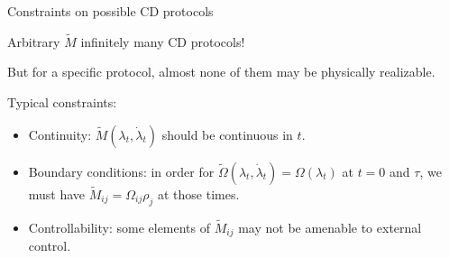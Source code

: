 \documentclass{beamer}
\begin{document}
\begin{frame}{Constraints on possible CD protocols}

  Arbitrary $\tilde{M}$ \quad \Rightarrow \quad infinitely many CD protocols!

  \vspace{1em}
  \pause

  But for a specific protocol, almost none of them may be {\color{blue} physically realizable}.

  \pause

  \vspace{1em} {\color{red} Typical constraints:}

  \begin{itemize}
  \item Continuity: $\tilde{M}(\lambda_t,\dot\lambda_t)$ should be
    continuous in $t$.
    \vspace{0.25em}
    \pause

  \item Boundary conditions:  in order for $\tilde{\Omega}(\lambda_t,\dot\lambda_t) = \Omega(\lambda_t)$ at $t=0$ and $\tau$, we must have $\tilde{M}_{ij} = \Omega_{ij}\rho_j$ at those times.
    \vspace{0.25em}
    \pause


  \item Controllability: some elements of $\tilde{M}_{ij}$ may not be
    amenable to external control.  
  \end{itemize}

\end{frame}
\end{document}
